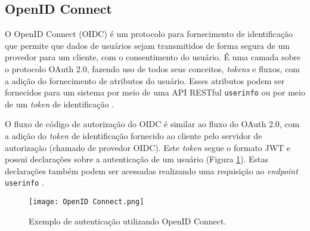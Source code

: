 \subsection{OpenID Connect}

O OpenID Connect (OIDC) é um protocolo para fornecimento de identificação que permite que dados de 
usuários sejam transmitidos de forma segura de um provedor para um cliente, com o consentimento do
usuário. É uma camada sobre o protocolo OAuth 2.0, fazendo uso de todos seus conceitos, 
\emph{tokens} e fluxos, com a adição do fornecimento de atributos do usuário. Esses atributos 
podem ser fornecidos para um sistema por meio de uma API RESTful \texttt{userinfo} ou por meio de 
um \emph{token} de identificação \cite{BIEHL2019}.

O fluxo de código de autorização do OIDC é similar ao fluxo do OAuth 2.0, com a adição do 
\emph{token} de identificação fornecido ao cliente pelo servidor de autorização (chamado de 
provedor OIDC). Este \emph{token} segue o formato JWT e possui declarações sobre a autenticação
de um usuário (Figura \ref{fig:OpenID}). Estas declarações também podem ser acessadas realizando uma 
requisição ao \emph{endpoint} \texttt{userinfo} \cite{OIDCCORE}. 

\begin{figure}[ht]
    \centering
    \texttt{[image: OpenID Connect.png]}
    \caption{Exemplo de autenticação utilizando OpenID Connect.}
    \label{fig:OpenID}
\end{figure}